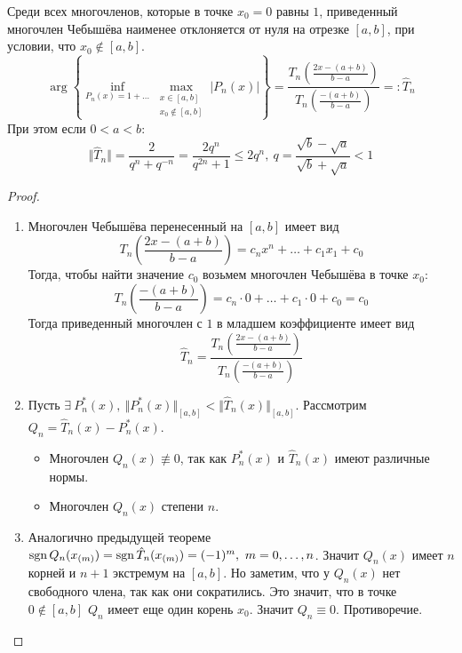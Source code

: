 \begin{theorem}
  Среди всех многочленов, которые в точке $x_0=0$ равны $1$,
  приведенный многочлен Чебышёва наименее
  отклоняется от нуля на отрезке $[a,b]$, при условии, что $x_0\notin[a,b]$.
  \[\arg\left\{\inf_{P_n(x)=1+\ldots}\max_{\substack{x\in[a,b] \\ x_0\notin[a,b]}}{|P_n(x)|}\right\}=\frac{T_n\left(\frac{2x-(a+b)}{b-a}\right)}{T_n\left(\frac{-(a+b)}{b-a}\right)}=:\hat{T}_n\]
  При этом если $0<a<b$:
  \[\Vert\hat{T}_n\Vert=\frac{2}{q^n+q^{-n}}=\frac{2q^n}{q^{2n}+1}\leq2q^n,\ q=\frac{\sqrt{b}-\sqrt{a}}{\sqrt{b}+\sqrt{a}}<1\]
\end{theorem}
\begin{proof}
  \begin{enumerate}
    \item Многочлен Чебышёва перенесенный на $[a,b]$ имеет вид
          \[T_n\left(\frac{2x-(a+b)}{b-a}\right)=c_{n}x^n+\ldots+c_1x_1+c_0\]
          Тогда, чтобы найти значение $c_0$ возьмем многочлен Чебышёва в точке $x_0$:
          \[T_n\left(\frac{-(a+b)}{b-a}\right)=c_n\cdot0+\ldots+c_1\cdot0+c_0=c_0\]
          Тогда приведенный многочлен с $1$ в младшем коэффициенте имеет вид
          \[\hat{T}_n=\frac{T_n\left(\frac{2x-(a+b)}{b-a}\right)}{T_n\left(\frac{-(a+b)}{b-a}\right)}\]
    \item Пусть $\exists\ P_n^*(x),\ \Vert P_n^*(x)\Vert_{[a,b]}<\Vert\hat{T}_n(x)\Vert_{[a,b]}$.
          Рассмотрим $Q_n=\hat{T}_n(x)-P_n^*(x)$.
          \begin{itemize}
            \item Многочлен $Q_{n}(x)\not\equiv0$, так
                  как $P_n^*(x)$ и $\hat{T}_n(x)$ имеют различные нормы.
            \item Многочлен $Q_{n}(x)$ степени $n$.
          \end{itemize}
    \item Аналогично предыдущей теореме $\sgn{Q_n(x_{(m)})}=\sgn{\hat{T}_n(x_{(m)})}=(-1)^m,\ m=0,\ldots,n$.
          Значит $Q_n(x)$ имеет $n$ корней и $n+1$ экстремум на $[a,b]$. Но заметим, что у $Q_n(x)$ нет
          свободного члена, так как они сократились. Это значит, что в точке $0\notin[a,b]$ $Q_n$ имеет
          еще один корень $x_0$. Значит $Q_n\equiv0$. Противоречие.


\end{enumerate}
\end{proof}
